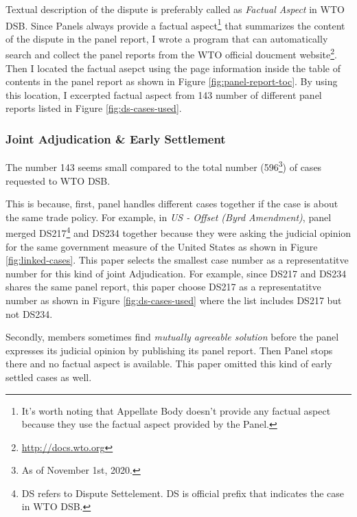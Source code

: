 Textual description of the dispute is preferably called as
\textit{Factual Aspect} in WTO DSB. 
Since Panels
always provide a factual aspect\footnote{
    It's worth noting that Appellate Body doesn't provide any factual aspect because they use the factual aspect provided by the Panel.
}
that summarizes the content of the dispute
in the panel report, %
I wrote a program that can 
automatically search and collect 
the panel reports from the WTO official doucment website\footnote{
    \url{http://docs.wto.org}
}.
Then I located the factual asepct using the page information inside the 
table of contents in the panel report as shown in Figure \ref{fig:panel-report-toc}.
By using this location, I excerpted factual aspect
from 143 number of different panel reports listed in Figure \ref{fig:ds-cases-used}.

\subsubsection{Joint Adjudication \& Early Settlement}

The number 143 seems small compared to the total number (596\footnote
{As of November 1st, 2020.}) of cases requested to WTO DSB. 

This is because, first, panel handles different cases together if the case is about the
same trade policy. For example, in \textit{US - Offset (Byrd Amendment)}, panel merged DS217\footnote{
    DS refers to Dispute Settelement. DS is official prefix that indicates the case in WTO DSB.
} and DS234 together because they were asking the judicial opinion for the same government measure of the United States as shown in Figure \ref{fig:linked-cases}. 
This paper selects the smallest case number as a representatitve number for this kind of joint Adjudication. 
For example, since DS217 and DS234 shares the same panel report, this paper choose DS217 as a representatitve number as shown in Figure \ref{fig:ds-cases-used} where the list includes DS217 but not DS234.

Secondly, members sometimes find \textit{mutually agreeable solution} before the panel expresses its judicial opinion by publishing its panel report. Then Panel stops there and no factual aspect is available. This paper omitted this kind of early settled cases as well.

 

